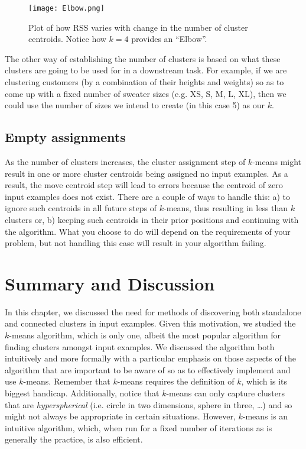 \begin{figure}
    \centering
    \texttt{[image: Elbow.png]}
         \caption{Plot of how RSS varies with change in the number of cluster centroids. Notice how $k = 4$ provides an ``Elbow''.}
         \label{fig:elbow}
\end{figure}
     

The other way of establishing the number of clusters is based on what these clusters are going to be used for in a downstream task. For example, if we are clustering customers (by a combination of their heights and weights) so as to come up with a fixed number of sweater sizes (e.g. XS, S, M, L, XL), then we could use the number of sizes we intend to create (in this case 5) as our $k$. 

\subsection{Empty assignments}

As the number of clusters increases, the cluster assignment step of $k$-means might result in one or more cluster centroids being assigned no input examples. As a result, the move centroid step will lead to errors because the centroid of zero input examples does not exist. There are a couple of ways to handle this: a) to ignore such centroids in all future steps of $k$-means, thus resulting in less than $k$ clusters or, b) keeping such centroids in their prior positions and continuing with the algorithm. What you choose to do will depend on the requirements of your problem, but not handling this case will result in your algorithm failing. 

\section{Summary and Discussion}

In this chapter, we discussed the need for methods of discovering both standalone and connected clusters in input examples. Given this motivation, we studied the $k$-means algorithm, which is only one, albeit the most popular algorithm for finding clusters amongst input examples. We discussed the algorithm both intuitively and more formally with a particular emphasis on those aspects of the algorithm that are important to be aware of so as to effectively implement and use $k$-means. Remember that $k$-means requires the definition of $k$, which is its biggest handicap. Additionally, notice that $k$-means can only capture clusters that are \emph{hyperspherical} (i.e. circle in two dimensions, sphere in three, \dots) and so might not always be appropriate in certain situations. However, $k$-means is an intuitive algorithm, which, when run for a fixed number of iterations as is generally the practice, is also efficient. 


